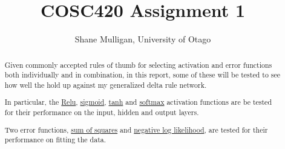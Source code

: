 \documentclass{article}
\begin{document}
\title{\sffamily \textbf{COSC420 Assignment 1}}

\author{Shane Mulligan, University of Otago}

\maketitle

\begin{abstract}
Given commonly accepted rules of thumb for selecting activation and error functions both individually and in combination, in this report, some of these will be tested to see how well the hold up against my generalized delta rule network.

In particular, the \uline{Relu}, \uline{sigmoid}, \uline{tanh} and \uline{softmax} activation functions are be tested for their performance on the input, hidden and output layers.

Two error functions, \uline{sum of squares} and \uline{negative log likelihood}, are tested for their performance on fitting the data.
\end{abstract}





% 
% 
\end{document}
